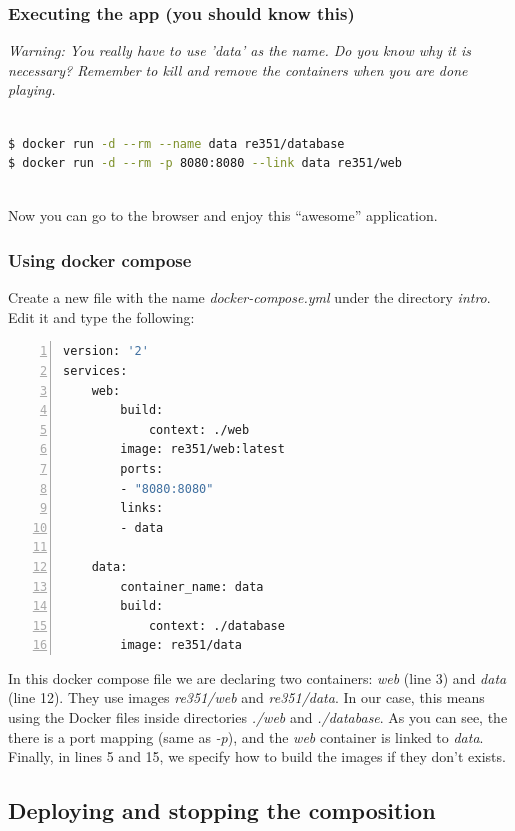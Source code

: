 \documentclass[a4paper,11pt]{exam}
\begin{document}
\subsubsection*{Executing the app (you should know this)}

\textit{Warning: You really have to use 'data' as the name. Do you know why it is necessary? Remember to kill and remove the containers when you are done playing.}

\begin{lstlisting}[frame=single,language={sh}]  % Start your code-block

$ docker run -d --rm --name data re351/database
$ docker run -d --rm -p 8080:8080 --link data re351/web 
      
\end{lstlisting}

Now you can go to the browser and enjoy this ``awesome'' application.

\subsubsection*{Using docker compose}

Create a new file with the name \textit{docker-compose.yml} under the directory \textit{intro}. Edit it and type the following:

\begin{lstlisting}[frame=single,language={sh}, tabsize=2, numbers=left]  
version: '2'
services:
	web:
		build:
			context: ./web
		image: re351/web:latest
		ports:
		- "8080:8080"
		links:
		- data

	data:
		container_name: data
		build:
			context: ./database
		image: re351/data       
\end{lstlisting}

In this docker compose file we are declaring two containers: \textit{web} (line 3) and \textit{data} (line 12).
They use images \textit{re351/web} and \textit{re351/data}.
In our case, this means using the Docker files inside directories \textit{./web} and \textit{./database}.
As you can see, the there is a port mapping (same as \textit{-p}), and the \textit{web} container is linked to \textit{data}.
Finally, in lines 5 and 15, we specify how to build the images if they don't exists. 

\subsection*{Deploying and stopping the composition}
\end{document}
